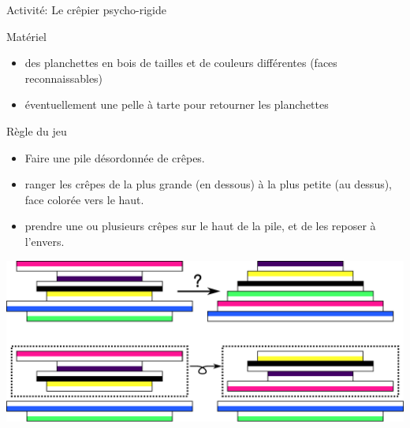 \begin{frame}{Activité: Le crêpier psycho-rigide}

  \begin{block}{Matériel}
    \begin{itemize}
    \item des planchettes en bois de tailles et de couleurs différentes (faces reconnaissables)
    \item éventuellement une pelle à tarte pour retourner les planchettes
    \end{itemize}
  \end{block}

  \begin{block}{Règle du jeu}
    \begin{itemize}
      \item {} Faire une pile désordonnée de crêpes.
      \item {} ranger les crêpes de la plus grande (en dessous) à la plus petite (au dessus), face colorée vers le haut.
      \item {} prendre une ou plusieurs crêpes sur le haut de la pile, et de les reposer à l'envers.
    \end{itemize}
  \end{block}

  \bigskip \bigskip \bigskip

  \begin{center}
    \includegraphics[width=0.8\linewidth]{img/crepier.pdf}
  \end{center}

\end{frame}

